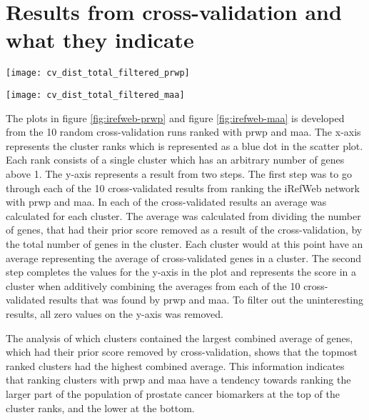 \section{Results from cross-validation and what they indicate}
\begin{sidewaysfigure}
    \texttt{[image: cv\_dist\_total\_filtered\_prwp]}
    \caption{Distribution of combined averages of genes, which had their scores
    \label{fig:irefweb-prwp}
    removed by cross-validation, ranked by PRWP}
\end{sidewaysfigure}

\begin{sidewaysfigure}
    \texttt{[image: cv\_dist\_total\_filtered\_maa]}
    \caption{Distribution of combined averages of genes, which had their scores
    \label{fig:irefweb-maa}
    removed by cross-validation, ranked by MAA}
\end{sidewaysfigure}

The plots in figure \ref{fig:irefweb-prwp} and figure \ref{fig:irefweb-maa} is
developed from the 10 random cross-validation runs ranked with \gls{prwp} and
\gls{maa}. The x-axis represents the cluster ranks which is represented as
a blue dot in the scatter plot. Each rank consists of a single cluster which has
an arbitrary number of genes above 1. The y-axis represents a result from two
steps. The first step was to go through each of the
10 cross-validated results from ranking the iRefWeb network with \gls{prwp} and
\gls{maa}. In each of the cross-validated results an average was calculated for
each cluster. The average was calculated from dividing the number of genes, that
had their prior score removed as a result of the cross-validation, by the total
number of genes in the cluster. Each cluster would at this point have an average
representing the average of cross-validated genes in a cluster. The second step
completes the values for the y-axis in the plot and represents the score in
a cluster when additively combining the averages from each of the 10
cross-validated results that was found by \gls{prwp} and \gls{maa}. To filter
out the uninteresting results, all zero values on the y-axis was removed.

The analysis of which clusters contained the largest combined average of genes,
which had their prior score removed by cross-validation, shows that the topmost
ranked clusters had the highest combined average. This information indicates
that ranking clusters with \gls{prwp} and \gls{maa} have a tendency towards
ranking the larger part of the population of prostate cancer biomarkers at the
top of the cluster ranks, and the lower at the bottom.

